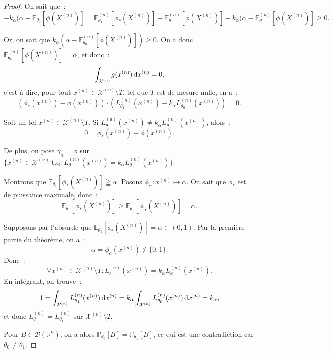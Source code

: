 \documentclass{report}
\DeclareMathOperator{\tq}{\text{ t.q. }}
\renewcommand{\P}{\mathbb P}
\newcommand{\E}{\mathbb E}
\newcommand{\R}{\mathbb R}
\newcommand{\Brl}{\mathcal B}  %
\newcommand{\n}{{(n)}}
\theoremstyle{definition}
\theoremstyle{remark}
\begin{document}
		\begin{proof} On sait que~:
		\[-k_\alpha(\alpha-\E_{\theta_0}[\phi(X^\n)] = \E_{\theta_1}^\n[\phi_*(X^\n)] - \E_{\theta_1}^\n[\phi(X^\n)] - k_\alpha(\alpha - \E_{\theta_0}^\n[\phi(X^\n)]
			\geq 0.\]

		Or, on sait que $k_\alpha(\alpha-\E_{\theta_0}^\n[\phi(X^\n)]) \geq 0$. On a donc $\E_{\theta_0}^\n[\phi(X^\n)] = \alpha$, et donc~:
		\[\int_{\mathcal X^\n}g(x^\n)\dif x^\n = 0,\]
		c'est à dire, pour tout $x^\n \in \mathcal X^\n \setminus T$, tel que $T$ est de mesure nulle, on a~:
		\[\left(\phi_*(x^\n) - \phi(x^\n)\right) \cdot \left(L_{\theta_1}^\n(x^\n) - k_\alpha L_{\theta_0}^\n(x^\n)\right) = 0.\]

		Soit un tel $x^\n \in \mathcal X^\n \setminus T$. Si $L_{\theta_1}^\n(x^\n) \neq k_\alpha L_{\theta_0}^\n(x^\n)$, alors~:
		\[0 = \phi_*(x^\n) - \phi(x^\n).\]

		De plus, on pose $\gamma_\alpha = \phi$ sur $\{x^\n \in \mathcal X^\n \tq L_{\theta_1}^\n(x^\n) = k_\alpha L_{\theta_0}^\n(x^\n)\}$.

		Montrons que $\E_{\theta_1}[\phi_*(X^\n)] \gneqq \alpha$. Posons $\phi_\alpha : x^\n \mapsto \alpha$. On sait que $\phi_*$ est de puissance maximale,
		donc~:
		\[\E_{\theta_1}[\phi_*(X^\n)] \geq \E_{\theta_1}[\phi_\alpha(X^\n)] = \alpha.\]

		Supposons par l'absurde que $\E_{\theta_1}[\phi_*(X^\n)] = \alpha \in (0, 1)$. Par la première partie du théorème, on a~:
		\[\alpha = \phi_\alpha(x^\n) \not \in \{0, 1\}.\]
		Donc~:
		\[\forall x^\n \in \mathcal X^\n \setminus T : L_{\theta_1}^\n(x^\n) = k_\alpha L_{\theta_0}^\n(x^\n).\]
		En intégrant, on trouve~:
		\[1 = \int_{\mathcal X^\n}L_{\theta_1}^\n(x^\n)\dif x^\n = k_\alpha\int_{\mathcal X^\n}L_{\theta_0}^\n(x^\n)\dif x^\n = k_\alpha,\]
		et donc $L_{\theta_0}^\n = L_{\theta_1}^\n$ sur $\mathcal X^\n \setminus T$.

		Pour $B \in \Brl(\R^n)$, on a alors $\P_{\theta_0}[B] = \P_{\theta_1}[B]$, ce qui est une contradiction car $\theta_0 \neq \theta_1$.
		\end{proof}
\end{document}
